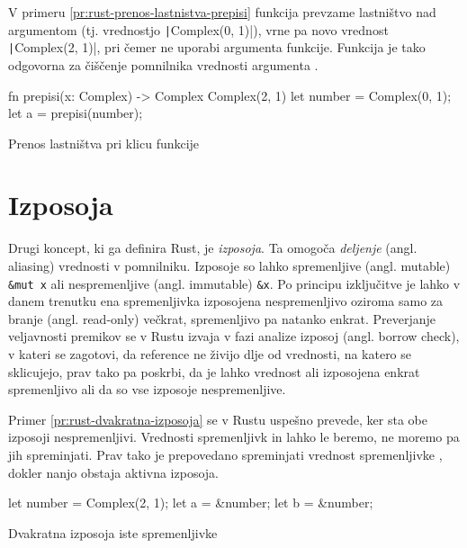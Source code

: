 V primeru \ref{pr:rust-prenos-lastnistva-prepisi} funkcija  prevzame lastništvo nad argumentom  (tj. vrednostjo \texttt|Complex(0, 1)|), vrne pa novo vrednost \texttt|Complex(2, 1)|, pri čemer ne uporabi argumenta funkcije. Funkcija  je tako odgovorna za čiščenje pomnilnika vrednosti argumenta .

\begin{primer}[ht]
\centering
\begin{rust-success}
fn prepisi(x: Complex) -> Complex { Complex(2, 1) }
let number = Complex(0, 1);
let a = prepisi(number);
\end{rust-success}
\caption{Prenos lastništva pri klicu funkcije }
\label{pr:rust-prenos-lastnistva-prepisi}
\end{primer}

\section{Izposoja}

Drugi koncept, ki ga definira Rust, je \textit{izposoja}. Ta omogoča \textit{deljenje} (angl. aliasing) vrednosti v pomnilniku. Izposoje so lahko spremenljive (angl. mutable) \texttt{\&mut x} ali nespremenljive (angl. immutable) \texttt{\&x}. Po principu izključitve je lahko v danem trenutku ena spremenljivka izposojena nespremenljivo oziroma samo za branje (angl. read-only) večkrat, spremenljivo pa natanko enkrat. Preverjanje veljavnosti premikov se v Rustu izvaja v fazi analize izposoj (angl. borrow check), v kateri se zagotovi, da reference ne živijo dlje od vrednosti, na katero se sklicujejo, prav tako pa poskrbi, da je lahko vrednost ali izposojena enkrat spremenljivo ali da so vse izposoje nespremenljive.

Primer \ref{pr:rust-dvakratna-izposoja} se v Rustu uspešno prevede, ker sta obe izposoji nespremenljivi. Vrednosti spremenljivk  in  lahko le beremo, ne moremo pa jih spreminjati. Prav tako je prepovedano spreminjati vrednost spremenljivke , dokler nanjo obstaja aktivna izposoja. 

\begin{primer}[ht]
\centering
\begin{rust-success}
let number = Complex(2, 1);
let a = &number;
let b = &number;
\end{rust-success}
\caption{Dvakratna izposoja iste spremenljivke}
\label{pr:rust-dvakratna-izposoja}
\end{primer}


